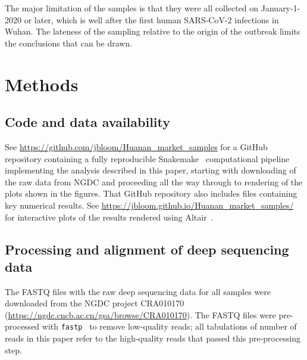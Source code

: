 \documentclass[9pt,twocolumn,twoside]{gsajnl_modified}
\begin{document}
The major limitation of the samples is that they were all collected on January-1-2020 or later, which is well after the first human SARS-CoV-2 infections in Wuhan.
The lateness of the sampling relative to the origin of the outbreak limits the conclusions that can be drawn.

{\small

\section{Methods}
\subsection{Code and data availability}
See \url{https://github.com/jbloom/Huanan_market_samples} for a GitHub repository containing a fully reproducible Snakemake~\citep{molder2021sustainable} computational pipeline implementing the analysis described in this paper, starting with downloading of the raw data from NGDC and proceeding all the way through to rendering of the plots shown in the figures.
That GitHub repository also includes files containing key numerical results.
See \url{https://jbloom.github.io/Huanan_market_samples/} for interactive plots of the results rendered using Altair~\citep{vanderplas2018altair}.

\subsection{Processing and alignment of deep sequencing data}
The FASTQ files with the raw deep sequencing data for all samples were downloaded from the NGDC project CRA010170 (\url{https://ngdc.cncb.ac.cn/gsa/browse/CRA010170}).
The FASTQ files were pre-processed with \texttt{fastp}~\citep{chen2018fastp} to remove low-quality reads; all tabulations of number of reads in this paper refer to the high-quality reads that passed this pre-processing step.

}
\end{document}
